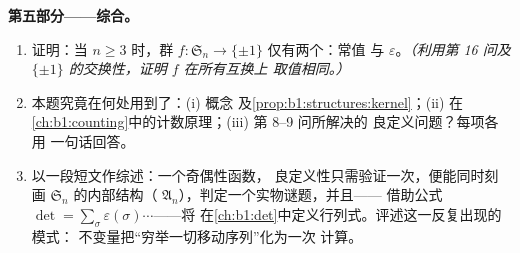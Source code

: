 \begin{problem}
\medskip
\noindent\textbf{第五部分——综合。}
\begin{enumerate}[resume]
  \item 证明：当 $n \geq 3$ 时，群 $f
        \colon \mathfrak S_n \to \{\pm 1\}$ 仅有两个：常值
        与 $\varepsilon$。\emph{（利用第 16 问及
        $\{\pm1\}$ 的交换性，证明 $f$ 在所有互换上
        取值相同。）}
  \item 本题究竟在何处用到了：(i) 概念
        及\cref{prop:b1:structures:kernel}；(ii) 在
        \cref{ch:b1:counting}中的计数原理；(iii) 第 8--9 问所解决的
        良定义问题？每项各用
        一句话回答。
  \item 以一段短文作综述：一个奇偶性函数，
        良定义性只需验证一次，便能同时刻画
        $\mathfrak S_n$ 的内部结构（
        $\mathfrak A_n$），判定一个实物谜题，并且——
        借助公式 $\det = \sum_\sigma
        \varepsilon(\sigma)\cdots$——将
        在\cref{ch:b1:det}中定义行列式。评述这一反复出现的模式：
        不变量把“穷举一切移动序列”化为一次
        计算。
\end{enumerate}
\end{problem}
